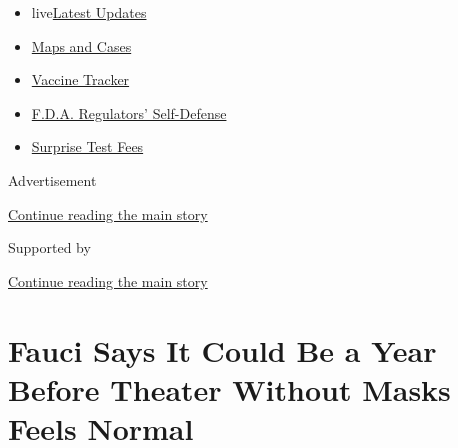 \begin{itemize}
\tightlist
\item
  live\href{https://www.nytimes3xbfgragh.onion/2020/09/12/world/covid-19-coronavirus.html?name=styln-coronavirus-national\&region=TOP_BANNER\&block=storyline_menu_recirc\&action=click\&pgtype=Article\&impression_id=30ab99e1-f52c-11ea-82ba-61bb0b8b9915\&variant=undefined}{Latest
  Updates}
\item
  \href{https://www.nytimes3xbfgragh.onion/interactive/2020/us/coronavirus-us-cases.html?name=styln-coronavirus-national\&region=TOP_BANNER\&block=storyline_menu_recirc\&action=click\&pgtype=Article\&impression_id=30abc0f0-f52c-11ea-82ba-61bb0b8b9915\&variant=undefined}{Maps
  and Cases}
\item
  \href{https://www.nytimes3xbfgragh.onion/interactive/2020/science/coronavirus-vaccine-tracker.html?name=styln-coronavirus-national\&region=TOP_BANNER\&block=storyline_menu_recirc\&action=click\&pgtype=Article\&impression_id=30abc0f1-f52c-11ea-82ba-61bb0b8b9915\&variant=undefined}{Vaccine
  Tracker}
\item
  \href{https://www.nytimes3xbfgragh.onion/2020/09/10/us/politics/fda-coronavirus-vaccine.html?name=styln-coronavirus-national\&region=TOP_BANNER\&block=storyline_menu_recirc\&action=click\&pgtype=Article\&impression_id=30abc0f2-f52c-11ea-82ba-61bb0b8b9915\&variant=undefined}{F.D.A.
  Regulators' Self-Defense}
\item
  \href{https://www.nytimes3xbfgragh.onion/2020/09/09/upshot/coronavirus-surprise-test-fees.html?name=styln-coronavirus-national\&region=TOP_BANNER\&block=storyline_menu_recirc\&action=click\&pgtype=Article\&impression_id=30abc0f3-f52c-11ea-82ba-61bb0b8b9915\&variant=undefined}{Surprise
  Test Fees}
\end{itemize}

Advertisement

\protect\hyperlink{after-top}{Continue reading the main story}

Supported by

\protect\hyperlink{after-sponsor}{Continue reading the main story}

\hypertarget{fauci-says-it-could-be-a-year-before-theater-without-masks-feels-normal}{%
\section{Fauci Says It Could Be a Year Before Theater Without Masks
Feels
Normal}\label{fauci-says-it-could-be-a-year-before-theater-without-masks-feels-normal}}

